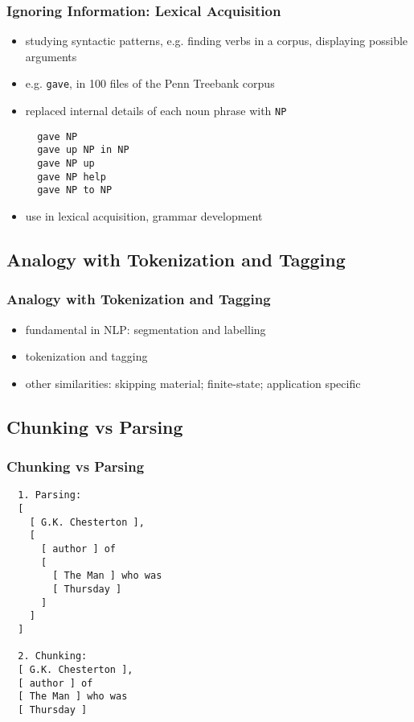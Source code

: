 \documentclass{beamer}             %
\begin{document}
\begin{frame}[fragile]
  \frametitle{Ignoring Information: Lexical Acquisition}

  \begin{itemize}
  \item studying syntactic patterns, e.g. finding verbs in a corpus, displaying possible arguments
  \item e.g. \texttt{gave}, in 100 files of the Penn Treebank corpus
  \item replaced internal details of each noun phrase with \texttt{NP}

\begin{verbatim}
  gave NP
  gave up NP in NP
  gave NP up
  gave NP help
  gave NP to NP
\end{verbatim}
    
  \item use in lexical acquisition, grammar development
  \end{itemize}
\end{frame}

\subsection{Analogy with Tokenization and Tagging}

\begin{frame}[fragile]
  \frametitle{Analogy with Tokenization and Tagging}

  \begin{itemize}
  \item fundamental in NLP: segmentation and labelling
  \item tokenization and tagging
  \centerline{}
  \item other similarities: skipping material; finite-state; application specific
  \end{itemize}
\end{frame}

\subsection{Chunking vs Parsing}

\begin{frame}[fragile]
  \frametitle{Chunking vs Parsing}
  \small

\begin{verbatim}
  1. Parsing:
  [
    [ G.K. Chesterton ],
    [
      [ author ] of
      [
        [ The Man ] who was
        [ Thursday ]
      ]
    ]
  ]

  2. Chunking:
  [ G.K. Chesterton ],
  [ author ] of
  [ The Man ] who was
  [ Thursday ]
\end{verbatim}
\end{frame}
\end{document}
